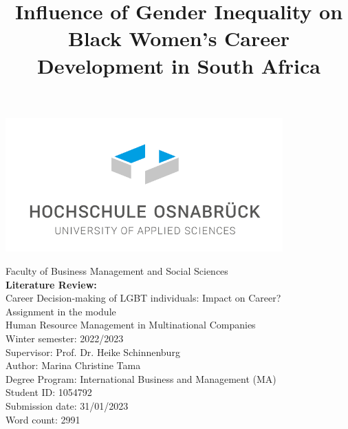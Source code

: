 \documentclass{article}
\begin{document}
\begin{titlepage}
    \centering
    \vspace*{1cm}
    \includegraphics[width=0.8\textwidth]{logo.png}
    \vspace{1.5cm}
    
    {\Large Faculty of Business Management and Social Sciences\\}
    \vspace{1.5cm}
    {\Huge \textbf{Literature Review:}\\}
    \vspace{0.5cm}
    {\LARGE Career Decision-making of LGBT individuals: Impact on Career?\\}
    \vspace{1.5cm}
    {\large Assignment in the module\\}
    Human Resource Management in Multinational Companies\\
    \vspace{1.5cm}
    Winter semester: 2022/2023\\
    \vspace{1cm}
    Supervisor: Prof. Dr. Heike Schinnenburg\\
    \vspace{2cm}
    Author: Marina Christine Tama\\
    Degree Program: International Business and Management (MA)\\
    Student ID: 1054792\\
    \vspace{1cm}
    Submission date: 31/01/2023\\
    \vspace{1cm}
    Word count: 2991
\end{titlepage}

\newpage

\title{Influence of Gender Inequality on Black Women's Career Development in South Africa}
\author{}
\date{}
\end{document}
